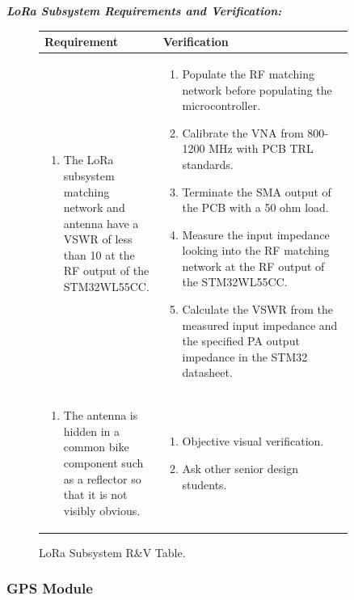 \documentclass{article}
\begin{document}
\textit{\textbf{LoRa Subsystem Requirements and Verification:}}

\begin{figure}[H]
	\begin{center}
		\begin{tabular}{|p{0.3 \linewidth}|p{0.6 \linewidth}|}
			\hline
			Requirement & Verification  \\
			\hline
			\begin{enumerate}
				\item The LoRa subsystem matching network and antenna have a VSWR of less than 10 at the RF output of the STM32WL55CC. 
			\end{enumerate}  & \begin{enumerate} 
			\item Populate the RF matching network before populating the microcontroller.
			\item Calibrate the VNA from 800-1200 MHz with PCB TRL standards. 
			\item Terminate the SMA output of the PCB with a 50 ohm load.
			\item Measure the input impedance looking into the RF matching network at the RF output of the STM32WL55CC.
			\item Calculate the VSWR from the measured input impedance and the specified PA output impedance in the STM32 datasheet. 
			\end{enumerate}
			 \\
			\hline
			\begin{enumerate}
				\item The antenna is hidden in a common bike component such as a reflector so that it is not visibly obvious. 
			\end{enumerate}  & \begin{enumerate}
			\item Objective visual verification. 
			\item Ask other senior design students.
		\end{enumerate} \\
			\hline
		\end{tabular}
	\end{center}
	\caption{LoRa Subsystem R\&V Table.}
\end{figure}


\subsubsection{GPS Module}
\end{document}
